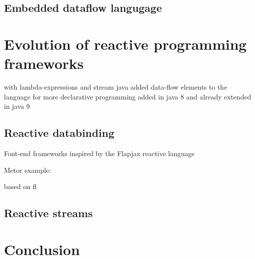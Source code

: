 \documentclass[format=acmtog]{acmart}
\begin{document}
	\subsection{Embedded dataflow langugage}

\section{Evolution of reactive programming frameworks}

	with lambda-expressions and stream java added data-flow elements to the language for more declarative programming
	added in java 8 and already extended in java 9

	\subsection{Reactive databinding}

		Font-end frameworks inspired by the Flapjax reactive language~\cite{Meyerovich:2009}

		Metor example: ~\cite{hochhaus2016meteor}

		based on fl

	\subsection{Reactive streams}

\section{Conclusion}




\end{document}
